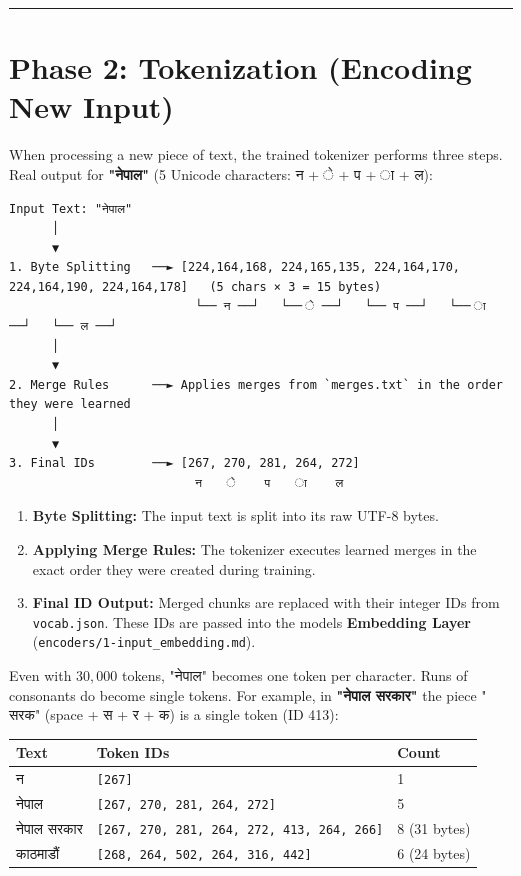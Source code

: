 \documentclass[11pt,a4paper,oneside]{report}
\providecommand{\tightlist}{\setlength{\itemsep}{0pt}\setlength{\parskip}{0pt}}
\begin{document}
\begin{center}\rule{0.5\linewidth}{0.5pt}\end{center}

\section{Phase 2: Tokenization (Encoding New Input)}\label{phase-2-tokenization-encoding-new-input}

When processing a new piece of text, the trained tokenizer performs three steps. Real output for \textbf{"नेपाल"} (5 Unicode characters: न + े + प + ा + ल):

\begin{Verbatim}[fontsize=\tiny]
Input Text: "नेपाल"
      │
      ▼
1. Byte Splitting   ──► [224,164,168, 224,165,135, 224,164,170, 224,164,190, 224,164,178]   (5 chars × 3 = 15 bytes)
                          └── न ──┘   └── े ──┘   └── प ──┘   └── ा ──┘   └── ल ──┘
      │
      ▼
2. Merge Rules      ──► Applies merges from `merges.txt` in the order they were learned
      │
      ▼
3. Final IDs        ──► [267, 270, 281, 264, 272]
                          न    े    प    ा    ल
\end{Verbatim}

\begin{enumerate}
\def\labelenumi{\arabic{enumi}.}
\tightlist
\item
  \textbf{Byte Splitting:} The input text is split into its raw UTF-8 bytes.
\item
  \textbf{Applying Merge Rules:} The tokenizer executes learned merges in the exact order they were created during training.
\item
  \textbf{Final ID Output:} Merged chunks are replaced with their integer IDs from \texttt{vocab.\allowbreak{}json}. These IDs are passed into the model\textquotesingle s \textbf{Embedding Layer} (\texttt{encoders/\allowbreak{}1-input\_\allowbreak{}embedding.\allowbreak{}md}).
\end{enumerate}

Even with \(30,000\) tokens, "नेपाल" becomes one token per character. Runs of consonants do become single tokens. For example, in \textbf{"नेपाल सरकार"} the piece " सरक" (space + स + र + क) is a single token (ID 413):

{\def\LTcaptype{none} %
\begin{longtable}[]{@{}lll@{}}
\toprule\noalign{}
Text & Token IDs & Count \\
\midrule\noalign{}
\endhead
\bottomrule\noalign{}
\endlastfoot
न & \texttt{{[}267{]}} & 1 \\
नेपाल & \texttt{{[}267,\ 270,\ 281,\ 264,\ 272{]}} & 5 \\
नेपाल सरकार & \texttt{{[}267,\ 270,\ 281,\ 264,\ 272,\ 413,\ 264,\ 266{]}} & 8 (31 bytes) \\
काठमाडौं & \texttt{{[}268,\ 264,\ 502,\ 264,\ 316,\ 442{]}} & 6 (24 bytes) \\
\end{longtable}
}
\end{document}
